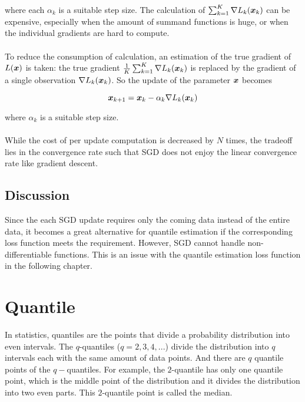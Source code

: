         
        where each $\alpha_k$ is a suitable step size. The calculation of $\sum_{k=1}^{K} \nabla L_k(\bm{x}_k)$ can be
        expensive, especially when the amount of summand functions is huge, or when the individual gradients are hard to
        compute. 
        \\\\
        To reduce the consumption of calculation, an estimation of the true gradient of $L(\bm{x})$ is taken: 
        the true gradient $\frac{1}{K} \sum_{k=1}^{K} \nabla L_k(\bm{x}_k)$ is replaced by the gradient of a single observation $\nabla L_k(\bm{x}_k)$. 
        So the update of the parameter $\bm{x}$ becomes
        
        \begin{equation}
            \bm{x}_{k+1} = \bm{x}_{k} - \alpha_k \nabla L_k(\bm{x}_k)
        \end{equation}
        
        where $\alpha_k$ is a suitable step size. 
        \\\\
        While the cost of per update computation is decreased by $N$ times, the tradeoff lies in the convergence rate such that SGD does not enjoy the linear convergence rate like gradient descent.

\subsection{Discussion}
Since the each SGD update requires only the coming data instead of the entire data, it becomes a great alternative for quantile estimation if the corresponding loss function meets the requirement.
However, SGD cannot handle non-differentiable functions. This is an issue with the quantile estimation loss function in the following chapter.


\section{Quantile}
\label{sec: quant}

In statistics, quantiles are the points that divide a probability distribution into even intervals.
The $q$-quantiles ($q = 2,3,4,...$) divide the distribution into $q$ intervals each with the same amount of data points.
And there are $q$ quantile points of the $q-$quantiles.
For example, the $2$-quantile has only one quantile point, which is the middle point of the distribution
and it divides the distribution into two even parts. This $2$-quantile point is called the median.
        
